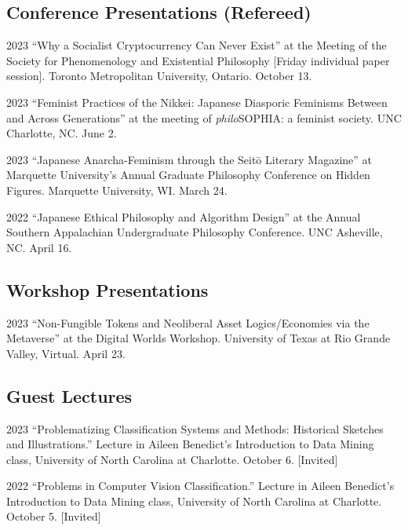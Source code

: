 \documentclass{article}
\begin{document}
\subsection*{\normalsize{Conference Presentations (Refereed)}}
\begin{tablist}
    \item[2023] \tab{}\enquote{Why a Socialist Cryptocurrency Can Never Exist} at the  Meeting of the Society for Phenomenology and Existential Philosophy [Friday individual paper session]. Toronto Metropolitan University, Ontario. October 13.
    \item[2023] \tab{}\enquote{Feminist Practices of the Nikkei: Japanese Diasporic Feminisms Between and Across Generations} at the  meeting of \textit{philo}SOPHIA: a feminist society. UNC Charlotte, NC. June 2.
    \item[2023] \tab{}\enquote{Japanese Anarcha-Feminism through the Seitō Literary Magazine} at Marquette University's Annual Graduate Philosophy Conference on Hidden Figures. Marquette University, WI. March 24.
    \item[2022] \tab{}\enquote{Japanese Ethical Philosophy and Algorithm Design} at the  Annual Southern Appalachian Undergraduate Philosophy Conference. UNC Asheville, NC. April 16.
\end{tablist}
\subsection*{\normalsize{Workshop Presentations}}
\begin{tablist}
    \item[2023] \tab{}\enquote{Non-Fungible Tokens and Neoliberal Asset Logics/Economies via the Metaverse} at the Digital Worlds Workshop. University of Texas at Rio Grande Valley, Virtual. April 23.
\end{tablist}
\subsection*{\normalsize{Guest Lectures}}
\begin{tablist}
    \item[2023] \tab{}\enquote{Problematizing Classification Systems and Methods: Historical Sketches and Illustrations.} Lecture in Aileen Benedict's Introduction to Data Mining class, University of North Carolina at Charlotte. October 6. [Invited]
    \item[2022] \tab{}\enquote{Problems in Computer Vision Classification.} Lecture in Aileen Benedict's Introduction to Data Mining class, University of North Carolina at Charlotte. October 5. [Invited]
\end{tablist}
\end{document}
